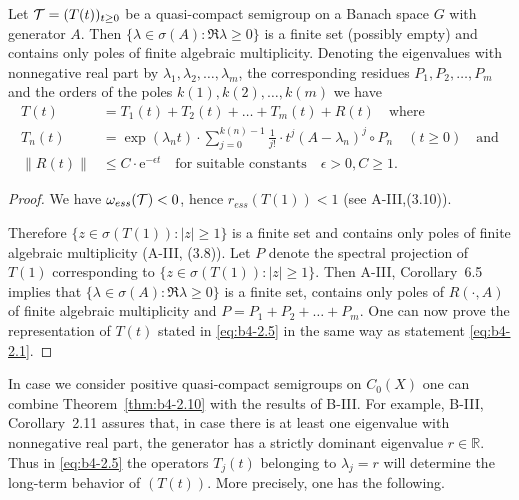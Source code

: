 \begin{theorem}\label{thm:b4-2.10}
%
	Let $\mathcal{T} = (T(t))_{t \geq 0}$ be a quasi-compact semigroup on a Banach space $G$ with generator $A$. 
    Then $\{\lambda \in \sigma(A) \colon \Re \lambda \geq 0\}$ is a finite set (possibly empty) and contains only poles of finite algebraic multiplicity. 
    Denoting the eigenvalues with nonnegative real part by $\lambda_1,\lambda_2, \ldots ,\lambda_m$, the corresponding residues $P_1,P_2, \ldots ,P_m$ and the orders of the poles $k(1),k(2), \ldots, k(m)$ we have
	\begin{equation}\label{eq:b4-2.5}
		\begin{aligned}
		T(t) &= T_1(t) + T_2(t) + \ldots + T_m(t) + R(t) \quad \text{where}\\
		T_n(t) &= \exp(\lambda_nt) \cdot \sum_{j=0}^{k(n)-1} \frac{1}{j!} \cdot t^j (A - \lambda_n)^j \circ P_n \quad (t \geq 0) \quad \text{and}\\
		\|R(t)\| &\leq C \cdot \mathrm{e}^{-\epsilon t} \quad \text{for suitable constants} \quad \epsilon > 0, C \geq 1 .		
		\end{aligned}
	\end{equation}
\end{theorem}
\begin{proof} We have $\omega_{ess}(\mathcal{T}) < 0$, hence $r_{ess}(T(1)) < 1$ (see A-III,(3.10)).

Therefore $\{z \in \sigma(T(1)) \colon |z| \geq 1\}$ is a finite set and contains only poles of finite algebraic multiplicity (\cf A-III, (3.8)). 
Let $P$ denote the spectral projection of $T(1)$ corresponding to $\{z \in \sigma(T(1))\colon |z| \geq 1\}$. 
Then A-III, Corollary~6.5 implies that $\{\lambda \in \sigma(A) \colon \Re  \lambda \geq 0\}$ is a finite set, contains only poles of $R(\cdot,A)$ of finite algebraic multiplicity and $P = P_1+P_2+ \ldots +P_m$. 
One can now prove the representation of $T(t)$ stated in \eqref{eq:b4-2.5} in the same way as statement \eqref{eq:b4-2.1}.
\end{proof}
In case we consider positive quasi-compact semigroups on $C_{0}(X)$ one can combine Theorem~\ref{thm:b4-2.10} with the results of B-III. 
For example, B-III, Corollary~2.11 assures that, in case there is at least one eigenvalue with nonnegative real part, the generator has a strictly dominant eigenvalue $r \in \mathbb{R}$. 
Thus in \eqref{eq:b4-2.5} the operators $T_j(t)$ belonging to $\lambda_j = r$ will determine the long-term behavior of $(T(t))$. More precisely, one has the following.
